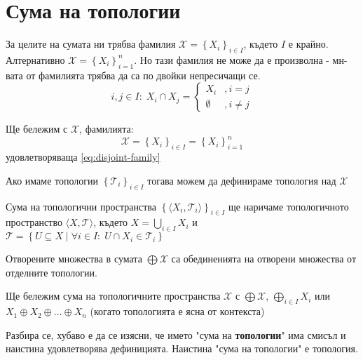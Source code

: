 \section{Сума на топологии}
За целите на сумата ни трябва фамилия $\mathcal X = \left\{X_i\right\}_{i \in I}$, където $I$ е крайно. Алтернативно $\mathcal X = \left\{X_i\right\}_{i=1}^{n}$. Но тази фамилия не може да е произволна - мн-вата от фамилията трябва да са по двойки непресичащи се.
\begin{equation} \label{eq:disjoint-family}
    i,j \in I:\; X_i \cap X_j = \begin{cases}
        X_i       & , i=j     \\
        \emptyset & , i\neq j
    \end{cases}
\end{equation}
\begin{notation}
    Ще бележим с $\mathcal X$, фамилията:
    \begin{equation*}
        \mathcal X = \left\{X_i\right\}_{i \in I} = \left\{X_i\right\}_{i=1}^{n}
    \end{equation*}
    удовлетворяваща \eqref{eq:disjoint-family}
\end{notation}

Ако имаме топологии $\left\{\mathcal T_i\right\}_{i \in I}$ тогава можем да дефинираме топология над $\mathcal X$
\begin{definition}\label{def:sum-topologies}
    Сума на топологични пространства $\left\{\langle X_i, \mathcal T_i\rangle\right\}_{i \in I}$ ще наричаме топологичното пространство $\langle X, \mathcal T\rangle$, където $X = \bigcup\limits_{i\in I}X_i$ и $\mathcal T = \left\{ U \subseteq X \mid \forall i \in I:\; U \cap X_i \in \mathcal T_i \right\}$
\end{definition}
\begin{fact}
    Отворените множества в сумата $\bigoplus \mathcal X$ са обединенията на отворени множества от отделните топологии.
\end{fact}
\begin{notation}
    Ще бележим сума на топологичните пространства $\mathcal X$ с $\bigoplus \mathcal X$, $\bigoplus\limits_{i\in I} X_i$ или $X_1 \oplus X_2 \oplus \dots \oplus X_n$ (когато топологията е ясна от контекста)
\end{notation}
Разбира се, хубаво е да се изясни, че името "сума на \textbf{топологии}" има смисъл и наистина удовлетворява дефиницията. Наистина "сума на топологии" е топология.

